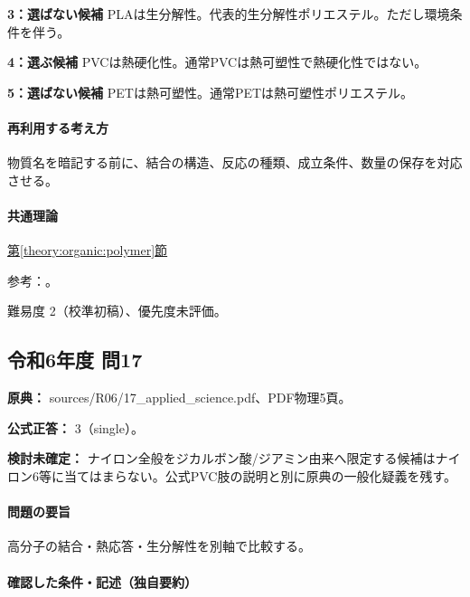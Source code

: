 \noindent\textbf{3：選ばない候補} PLAは生分解性。代表的生分解性ポリエステル。ただし環境条件を伴う。\par

\noindent\textbf{4：選ぶ候補} PVCは熱硬化性。通常PVCは熱可塑性で熱硬化性ではない。\par

\noindent\textbf{5：選ばない候補} PETは熱可塑性。通常PETは熱可塑性ポリエステル。\par

\paragraph{再利用する考え方} 物質名を暗記する前に、結合の構造、反応の種類、成立条件、数量の保存を対応させる。

\paragraph{共通理論} \hyperref[theory:organic:polymer]{第\ref*{theory:organic:polymer}節}

\par 参考：\cite{organic_physical,organic_step,organic_jbpa}。

\par 難易度 2（校準初稿）、優先度未評価。

\subsection{令和6年度 問17}
\label{q:r06-reg-applied-17}

\noindent\textbf{原典：} sources/R06/17\_applied\_science.pdf、PDF物理5頁。

\textbf{公式正答：} 3（single）。

\par\textbf{検討未確定：} ナイロン全般をジカルボン酸/ジアミン由来へ限定する候補はナイロン6等に当てはまらない。公式PVC肢の説明と別に原典の一般化疑義を残す。

\paragraph{問題の要旨} 高分子の結合・熱応答・生分解性を別軸で比較する。

\paragraph{確認した条件・記述（独自要約）}\mbox{}\par

